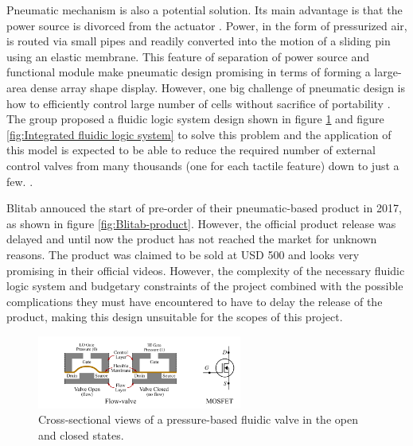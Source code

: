 Pneumatic mechanism is also a potential solution.
Its main advantage is that the power source is divorced from the actuator \cite{russomanno_design_2015}.
Power, in the form of pressurized air, is routed via small pipes and readily converted into the motion of a sliding pin using an elastic membrane.
This feature of separation of power source and functional module make pneumatic design promising in terms of forming a large-area dense array shape display.
However, one big challenge of pneumatic design is how to efficiently control large number of cells without sacrifice of portability \cite{russomanno_model-based_2017}.
The group proposed a fluidic logic system design shown in figure \ref{fig:pneumatic-schema} and figure \ref{fig:Integrated fluidic logic system} to solve this problem and the application of this model is expected to be able to reduce the required number of external control valves from many thousands (one for each tactile feature) down to just a few. \cite{russomanno_design_2015}.

Blitab annouced the start of pre-order of their pneumatic-based product in 2017, as shown in figure \ref{fig:Blitab-product}. However, the official product release was delayed and until now the product has not reached the market for unknown reasons. The product was claimed to be sold at USD 500  and looks very promising in their official videos. However, the complexity of the necessary fluidic logic system and budgetary constraints of the project combined with the possible complications they must have encountered to have to delay the release of the product, making this design unsuitable for the scopes of this project.

\begin{figure}\centering
    \includegraphics[width=0.6\textwidth]{figures/pneumatic-schema.png}
\caption{Cross-sectional views of a pressure-based fluidic valve in the open and closed states.}
\label{fig:pneumatic-schema}
\end{figure}

